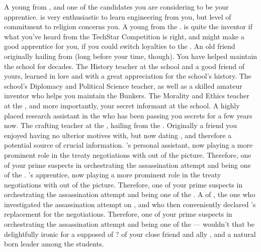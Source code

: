 \documentclass[char]{GL2020}
\begin{document}
\begin{contacts}
    \contact{\cInitiate{}} A young \cInitiate{\person} from \pShip{}, and one of the candidates you are considering to be your apprentice. \cInitiate{} is very enthusiastic to learn engineering from you, but \cInitiate{\their} level of commitment to religion concerns you.
    \contact{\cTechStar{}} A young \cTechStar{\person} from the \pTech{}. \cTechStar{} is quite the inventor if what you've heard from the TechStar Competition is right, and might make a good apprentice for you, if you could switch \cTechStar{\their} loyalties to the \pShip{}.
    \contact{\cPrincipal{}} An old friend originally hailing from \pShip{} (long before your time, though). You have helped \cPrincipal{\them} maintain the school for decades.
    \contact{\cHistory{}} The History teacher at the school and a good friend of yours, learned in lore and with a great appreciation for the school's history.
    \contact{\cChupInventor{}} The school’s Diplomacy and Political Science teacher, as well as a skilled amateur inventor who helps you maintain the Bunkers. 
    \contact{\cEthics{}} The Morality and Ethics teacher at the \pSchool{}, and more importantly, your secret informant at the school.
    \contact{\cAssistantScientist{}} A highly placed research assistant in the \pTech{} who has been passing you secrets for a few years now.
    \contact{\cPirate{}} The crafting teacher at the \pSchool{}, hailing from the \pShip{}. Originally a friend you enjoyed having no ulterior motives with, but now dating \cPrince{}, and therefore a potential source of crucial information.
    \contact{\cChupLeader{}} \cHeadDiplomat{}'s personal assistant, now playing a more prominent role in the treaty negotiations with \cHeadDiplomat{} out of the picture. Therefore, one of your prime suspects in orchestrating the assassination attempt and being one of the \pGoaties{}.
    \contact{\cJuniorStatesman{}} \cHeadDiplomat{}'s apprentice, now playing a more prominent role in the treaty negotiations with \cHeadDiplomat{} out of the picture. Therefore, one of your prime suspects in orchestrating the assassination attempt and being one of the \pGoaties{}.
    \contact{\cEbbPriest{}} A \cEbbPriest{\cleric} of \cEbb{}, the one who investigated the assassination attempt on \cHeadDiplomat{}, and who then conveniently declared \cEbbPriest{\themself} \cHeadDiplomat{}'s replacement for the negotiations. Therefore, one of your prime suspects in orchestrating the assassination attempt and being one of the \pGoaties{} — wouldn't that be delightfully ironic for a supposed \cEbbPriest{\cleric} of \cEbb{}?
    \contact{\cPresident{}} \cPresident{\Nibling} of your close friend and ally \cHeadDiplomat{}, and a natural born leader among the students.
\end{contacts}
\end{document}
